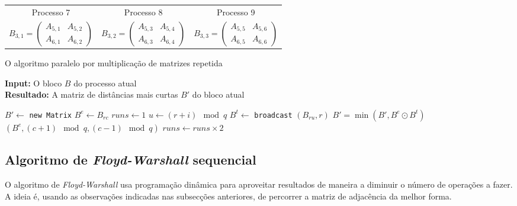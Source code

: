 \documentclass[10pt,a4paper,oneside]{article}
\begin{document}
\begin{table}[t]
\begin{tabular}{|c|c|c|}
    \hline
    Processo 7 & Processo 8 & Processo 9 \\
    $B_{3,1} = 
    \begin{pmatrix}
      A_{5,1} & A_{5,2} \\
      A_{6,1} & A_{6,2}
    \end{pmatrix}$ &
    $B_{3,2} = 
    \begin{pmatrix}
      A_{5,3} & A_{5,4} \\
      A_{6,3} & A_{6,4}
    \end{pmatrix}$ &
    $B_{3,3} = 
    \begin{pmatrix}
      A_{5,5} & A_{5,6} \\
      A_{6,5} & A_{6,6}
    \end{pmatrix}$ \\
    \hline
  \end{tabular}
\end{table}

\begin{algorithm}[b]
\small
\caption{O algoritmo paralelo por multiplicação de matrizes repetida}
\renewcommand{\arraystretch}{0.85}
\textbf{Input:} O bloco $B$ do processo atual\\
\textbf{Resultado:} A matriz de distâncias mais curtas $B'$ do bloco atual\\
\renewcommand{\arraystretch}{1.0}
\label{alg:alg2}
\begin{algorithmic}[1]
\State $B' \leftarrow $ {\tt new Matrix} 
\State $B^e \leftarrow B_{rc}$ 
\State $runs \leftarrow 1$
    \State $u \leftarrow (r + i) \mod q$
    \State $B^t \leftarrow$ {\tt broadcast} $(B_{ru}, r)$
    \State $B' = \min(B', B^e \odot B^t)$
     $(B^e, (c + 1) \mod q, (c - 1) \mod q)$
  \EndFor
  \State $runs \leftarrow runs \times 2$
\EndWhile
\end{algorithmic}
\end{algorithm}

\subsection{Algoritmo de \textit{Floyd-Warshall} sequencial}
O algoritmo de \textit{Floyd-Warshall} usa programação dinâmica para
aproveitar resultados de maneira a diminuir o número de operações a
fazer. A ideia é, usando as observações indicadas nas subsecções
anteriores, de percorrer a matriz de adjacência da melhor forma.
\end{document}
